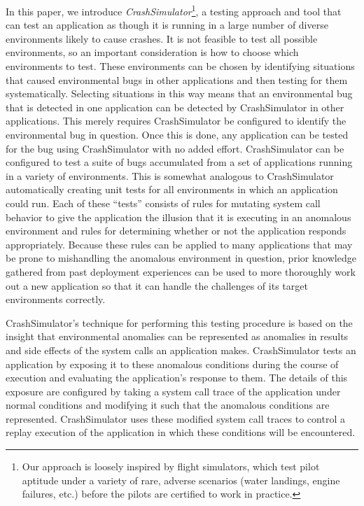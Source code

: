 In this paper, we introduce {\em CrashSimulator}\footnote{ Our approach is
loosely inspired by flight simulators, which test pilot aptitude under a
variety of rare, adverse scenarios (water landings, engine failures, etc.)
before the pilots are certified to work in practice.}, a testing approach
and tool that can test an application as though it is running in a large
number of diverse environments likely to cause crashes.  It is not feasible
to test all possible environments, so an important consideration is how to
choose which environments to test.  These environments can be chosen by
identifying situations that caused environmental bugs in other applications
and then testing for them systematically.  Selecting situations in this way
means that an environmental bug that is detected in one application can be
detected by CrashSimulator in other applications.  This merely requires
CrashSimulator be configured to identify the environmental bug in question.
Once this is done, any application can be tested for the bug using
CrashSimulator with no added effort.  CrashSimulator can be configured to
test a suite of bugs accumulated from a set of applications running in a
variety of environments.  This is somewhat analogous to CrashSimulator
automatically creating unit tests for all environments in which an
application could run.  Each of these ``tests'' consists of rules for
mutating system call behavior to give the application the illusion that it
is executing in an anomalous environment and rules for determining whether
or not the application responds appropriately.  Because these rules can be
applied to many applications that may be prone to mishandling the anomalous
environment in question, prior knowledge gathered from past deployment
experiences can be used to more thoroughly work out a new application so
that it can handle the challenges of its target environments correctly.

CrashSimulator's technique for performing this testing procedure is based
on the insight that environmental anomalies can be represented as anomalies
in results and side effects of the system calls an application makes.
CrashSimulator tests an application by exposing it to these anomalous
conditions during the course of execution and evaluating the application's
response to them.  The details of this exposure are configured by taking a
system call trace of the application under normal conditions and modifying
it such that the anomalous conditions are represented.  CrashSimulator uses
these modified system call traces to control a replay execution of the
application in which these conditions will be encountered.

